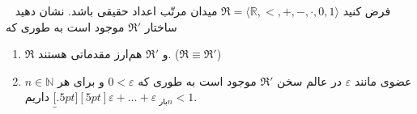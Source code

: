 ~
فرض کنید $\mathfrak{R} = \langle \mathbb{R}, <, +, -, \cdot, 0, 1 \rangle$ میدان مرتّب اعداد حقیقی باشد. نشان دهید ساختار $\mathfrak{R}'$ موجود است به طوری که
\begin{enumerate}[label=(\alph*)]
  \item $\mathfrak{R}$ و $\mathfrak{R}'$ هم‌ارز مقدماتی هستند. ($\mathfrak{R} \equiv \mathfrak{R}'$)
  \item عضوی مانند $\varepsilon$ در عالم سخن $\mathfrak{R}'$ موجود است به طوری که $0 < \varepsilon$ و برای هر $n \in \mathbb{N}$ داریم $\underbracket[.5pt][5pt]{\varepsilon + \dots + \varepsilon}_{\text{ بار} n} < 1$.
\end{enumerate}